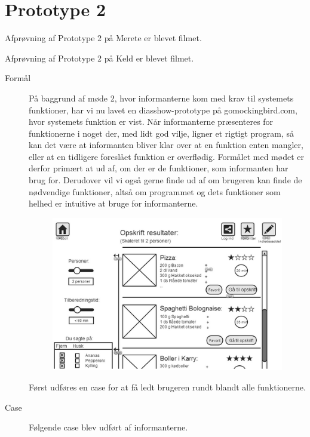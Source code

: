 \section{Prototype 2}
\label{ap:prototype2}

Afprøvning af Prototype 2 på Merete er blevet filmet\cite{prototype2merete}.

Afprøvning af Prototype 2 på Keld er blevet filmet\cite{prototype2keld}.

\begin{description}
\item[Formål] På baggrund af møde 2, hvor informanterne kom med krav til systemets funktioner, har vi nu lavet en diasshow-prototype på gomockingbird.com, hvor systemets funktion er vist. Når informanterne præsenteres for funktionerne i noget der, med lidt god vilje, ligner et rigtigt program, så kan det være at informanten bliver klar over at en funktion enten mangler, eller at en tidligere foreslået funktion er overflødig. Formålet med mødet er derfor primært at ud af, om der er de funktioner, som informanten har brug for. Derudover vil vi også gerne finde ud af om brugeren kan finde de nødvendige funktioner, altså om programmet og dets funktioner som helhed er intuitive at bruge for informanterne.
\begin{figure}[H]
\centering
\includegraphics[scale=0.7]{billeder/prototyper/prototype2.png}
\label{fig:prototype2}
\end{figure}

Først udføres en case for at få ledt brugeren rundt blandt alle funktionerne.

\item[Case] Følgende case blev udført af informanterne.


\end{description}
